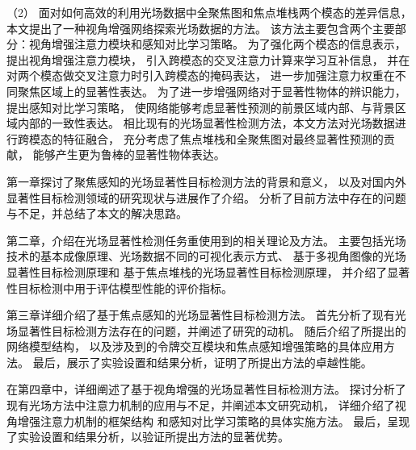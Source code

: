 %
%
（2）
%
%
面对如何高效的利用光场数据中全聚焦图和焦点堆栈两个模态的差异信息，
本文提出了一种视角增强网络探索光场数据的方法。
%
%
该方法主要包含两个主要部分：视角增强注意力模块和感知对比学习策略。
%
%
为了强化两个模态的信息表示，提出视角增强注意力模块，
引入跨模态的交叉注意力计算来学习互补信息，
并在对两个模态做交叉注意力时引入跨模态的掩码表达，
进一步加强注意力权重在不同聚焦区域上的显著性表达。
%
%
为了进一步增强网络对于显著性物体的辨识能力，
提出感知对比学习策略，
使网络能够考虑显著性预测的前景区域内部、与背景区域内部的一致性表达。
%
%
相比现有的光场显著性检测方法，本文方法对光场数据进行跨模态的特征融合，
充分考虑了焦点堆栈和全聚焦图对最终显著性预测的贡献，
能够产生更为鲁棒的显著性物体表达。





第一章探讨了聚焦感知的光场显著性目标检测方法的背景和意义，
以及对国内外显著性目标检测领域的研究现状与进展作了介绍。
分析了目前方法中存在的问题与不足，并总结了本文的解决思路。


第二章，介绍在光场显著性检测任务重使用到的相关理论及方法。
主要包括光场技术的基本成像原理、光场数据不同的可视化表示方式、
基于多视角图像的光场显著性目标检测原理和
基于焦点堆栈的光场显著性目标检测原理，
并介绍了显著性目标检测中用于评估模型性能的评价指标。


第三章详细介绍了基于焦点感知的光场显著性目标检测方法。
首先分析了现有光场显著性目标检测方法存在的问题，并阐述了研究的动机。
随后介绍了所提出的网络模型结构，
以及涉及到的令牌交互模块和焦点感知增强策略的具体应用方法。
最后，展示了实验设置和结果分析，证明了所提出方法的卓越性能。


在第四章中，详细阐述了基于视角增强的光场显著性目标检测方法。
探讨分析了现有光场方法中注意力机制的应用与不足，并阐述本文研究动机，
详细介绍了视角增强注意力机制的框架结构
和感知对比学习策略的具体实施方法。
最后，呈现了实验设置和结果分析，以验证所提出方法的显著优势。































